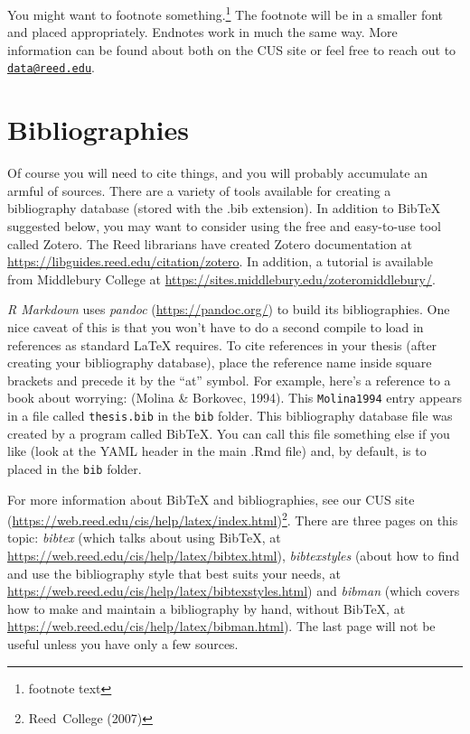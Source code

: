 \documentclass[12pt,twoside]{reedthesis}
\begin{document}
You might want to footnote something.\footnote{footnote text} The footnote will be in a smaller font and placed appropriately. Endnotes work in much the same way. More information can be found about both on the CUS site or feel free to reach out to \href{mailto:data@reed.edu}{\nolinkurl{data@reed.edu}}.

\hypertarget{bibliographies}{%
\section{Bibliographies}\label{bibliographies}}

Of course you will need to cite things, and you will probably accumulate an armful of sources. There are a variety of tools available for creating a bibliography database (stored with the .bib extension). In addition to BibTeX suggested below, you may want to consider using the free and easy-to-use tool called Zotero. The Reed librarians have created Zotero documentation at \url{https://libguides.reed.edu/citation/zotero}. In addition, a tutorial is available from Middlebury College at \url{https://sites.middlebury.edu/zoteromiddlebury/}.

\emph{R Markdown} uses \emph{pandoc} (\url{https://pandoc.org/}) to build its bibliographies. One nice caveat of this is that you won't have to do a second compile to load in references as standard LaTeX requires. To cite references in your thesis (after creating your bibliography database), place the reference name inside square brackets and precede it by the ``at'' symbol. For example, here's a reference to a book about worrying: (Molina \& Borkovec, 1994). This \texttt{Molina1994} entry appears in a file called \texttt{thesis.bib} in the \texttt{bib} folder. This bibliography database file was created by a program called BibTeX. You can call this file something else if you like (look at the YAML header in the main .Rmd file) and, by default, is to placed in the \texttt{bib} folder.

For more information about BibTeX and bibliographies, see our CUS site (\url{https://web.reed.edu/cis/help/latex/index.html})\footnote{Reed~College (2007)}. There are three pages on this topic: \emph{bibtex} (which talks about using BibTeX, at \url{https://web.reed.edu/cis/help/latex/bibtex.html}), \emph{bibtexstyles} (about how to find and use the bibliography style that best suits your needs, at \url{https://web.reed.edu/cis/help/latex/bibtexstyles.html}) and \emph{bibman} (which covers how to make and maintain a bibliography by hand, without BibTeX, at \url{https://web.reed.edu/cis/help/latex/bibman.html}). The last page will not be useful unless you have only a few sources.
\end{document}
